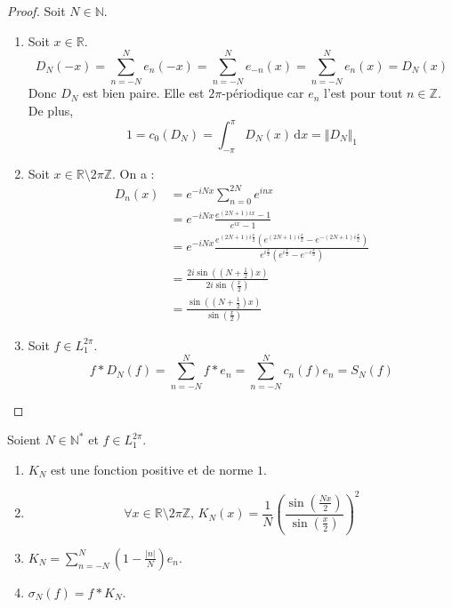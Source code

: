 	\begin{proof}
		Soit $N \in \mathbb{N}$.
		\begin{enumerate}[label=(\roman*)]
			\item Soit $x \in \mathbb{R}$.
			\[ D_N(-x) = \sum_{n=-N}^{N} e_n(-x) = \sum_{n=-N}^{N} e_{-n}(x) = \sum_{n=-N}^{N} e_n(x) = D_N(x) \]
			Donc $D_N$ est bien paire. Elle est $2\pi$-périodique car $e_n$ l'est pour tout $n \in \mathbb{Z}$. De plus,
			\[ 1 = c_0(D_N) = \int_{-\pi}^{\pi} D_N(x) \, \mathrm{d}x = \Vert D_N \Vert_1 \]
			\item Soit $x \in \mathbb{R}\setminus 2\pi\mathbb{Z}$. On a :
			\begin{align*}
				D_n(x) &= e^{-iNx} \sum_{n=0}^{2N} e^{inx} \\
				&= e^{-iNx} \frac{e^{(2N+1)ix} - 1}{e^{ix} - 1} \\
				&= e^{-iNx} \frac{e^{(2N+1) i\frac{x}{2}} \left ( e^{(2N+1) i\frac{x}{2}} - e^{-(2N+1) i\frac{x}{2}} \right )}{e^{i\frac{x}{2}} \left( e^{i\frac{x}{2}} - e^{-i \frac{x}{2}} \right)} \\
				&= \frac{2i \sin \left( \left( N + \frac{1}{2} \right) x \right)}{2i \sin \left ( \frac{x}{2} \right)} \\
				&= \frac{\sin \left( \left( N + \frac{1}{2} \right) x \right)}{\sin \left ( \frac{x}{2} \right)}
			\end{align*}
			\item Soit $f \in L_1^{2 \pi}$.
			\[ f * D_N(f) = \sum_{n=-N}^N f * e_n = \sum_{n=-N}^N c_n(f) e_n = S_N(f) \]
		\end{enumerate}
	\end{proof}

	\begin{lemma}
		\label{theoreme-de-fejer-2}
		Soient $N \in \mathbb{N}^*$ et $f \in L_1^{2 \pi}$.
		\begin{enumerate}[label=(\roman*)]
			\item $K_N$ est une fonction positive et de norme $1$.
			\item \[ \forall x \in \mathbb{R} \setminus 2 \pi \mathbb{Z}, \, K_N(x) = \frac{1}{N} \left(\frac{\sin \left( \frac{Nx}{2} \right)}{\sin \left( \frac{x}{2} \right)}\right)^2 \]
			\item $K_N = \sum_{n=-N}^{N} \left(1 - \frac{\vert n \vert}{N}\right) e_n$.
			\item $\sigma_N(f) = f * K_N$.
		\end{enumerate}
	\end{lemma}

